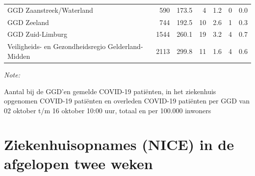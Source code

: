 \documentclass[
  english,
  man,floatsintext]{apa6}
\begin{document}
\begin{table}
\begin{threeparttable}
\begin{tabular}{lrrrrrr}
GGD Zaanstreek/Waterland & 590 & 173.5 & 4 & 1.2 & 0 & 0.0\\
GGD Zeeland & 744 & 192.5 & 10 & 2.6 & 1 & 0.3\\
GGD Zuid-Limburg & 1544 & 260.1 & 19 & 3.2 & 4 & 0.7\\
Veiligheids- en Gezondheidsregio Gelderland-Midden & 2113 & 299.8 & 11 & 1.6 & 4 & 0.6\\
\bottomrule
\end{tabular}
\begin{tablenotes}
\item \textit{Note: } 
\item Aantal bij de GGD’en gemelde COVID-19 patiënten, in het ziekenhuis opgenomen COVID-19 patiënten en overleden COVID-19 patiënten per GGD van 02 oktober t/m 16 oktober 10:00 uur, totaal en per 100.000 inwoners
\end{tablenotes}
\end{threeparttable}
\endgroup{}
\end{table}

\newpage

\hypertarget{ziekenhuisopnames-nice-in-de-afgelopen-twee-weken}{%
\section{Ziekenhuisopnames (NICE) in de afgelopen twee weken}\label{ziekenhuisopnames-nice-in-de-afgelopen-twee-weken}}
\end{document}
